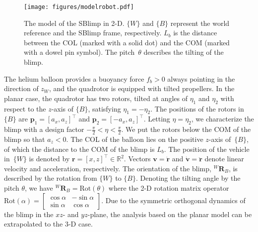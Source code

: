 \documentclass[conference]{ieeeconf}
\begin{document}
\begin{figure}[t]
    \centering
    \texttt{[image: figures/modelrobot.pdf]}
    \caption{The model of the SBlimp in 2-D. $\{W\}$ and $\{B\}$ represent the world reference and the SBlimp frame, respectively. $L_b$ is the distance between the COL (marked with a solid dot) and the COM (marked with a dowel pin symbol). The pitch~$\theta$ describes the tilting of the blimp.
    }    
    \label{fig:blimpfigure}
    \vspace{-2em}
\end{figure}

The helium balloon provides a buoyancy force $f_b > 0$ always pointing in the direction of $z_W$, and the quadrotor is equipped with tilted propellers. 
In the planar case, the quadrotor has two rotors, tilted at angles of $\eta_1$ and $\eta_2$ with respect to the $z$-axis of $\{B\}$, satisfying $\eta_1 = -\eta_2$.
The positions of the rotors in $\{B\}$ are $\boldsymbol{p}_1=\left[a_x, a_z\right]^\top$ and $\boldsymbol{p}_2=\left[-a_x, a_z\right]^\top$. Letting $\eta = \eta_2$, we characterize the blimp with a design factor $-\frac{\pi}{2} < \eta < \frac{\pi}{2}$. %
We put the rotors below the COM of the blimp so that $a_z < 0$. 
The COL of the balloon lies on the positive $z$-axis of~$\{B\}$, of which the distance to the COM of the blimp is $L_b$. 
% 
The position of the vehicle in~$\{W\}$ is denoted by $\boldsymbol{r} = \left[x, z\right]^\top\in\mathbb{R}^2$. 
Vectors $\boldsymbol{v = \dot{r}}$ and $\boldsymbol{\dot{v} = \ddot{r}}$ denote linear velocity and acceleration, respectively. 
The orientation of the blimp, ${}^W\!\!\boldsymbol{R}\!_B$, is described by the rotation from $\{W\}$ to $\{B\}$. Denoting the tilting angle by the pitch $\theta$, we have ${}^W\!\!\boldsymbol{R}\!_B = \text{Rot}(\theta)$ where the 2-D rotation matrix operator $\text{Rot}(\alpha) = \begin{bmatrix}
\cos{\alpha} & -\sin{\alpha}\\
\sin{\alpha} & \cos{\alpha}
\end{bmatrix}$. 
Due to the symmetric orthogonal dynamics of the blimp in the $xz$- and $yz$-plane, the analysis based on the planar model can be extrapolated to the 3-D case. 
\end{document}
